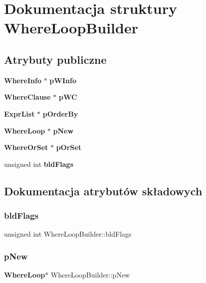 \section{Dokumentacja struktury Where\+Loop\+Builder}
\label{struct_where_loop_builder}
\subsection*{Atrybuty publiczne}
\begin{DoxyCompactItemize}
\item 
\textbf{ Where\+Info} $\ast$ \textbf{ p\+W\+Info}
\item 
\textbf{ Where\+Clause} $\ast$ \textbf{ p\+WC}
\item 
\textbf{ Expr\+List} $\ast$ \textbf{ p\+Order\+By}
\item 
\textbf{ Where\+Loop} $\ast$ \textbf{ p\+New}
\item 
\textbf{ Where\+Or\+Set} $\ast$ \textbf{ p\+Or\+Set}
\item 
unsigned int \textbf{ bld\+Flags}
\end{DoxyCompactItemize}


\subsection{Dokumentacja atrybutów składowych}
\mbox{\label{struct_where_loop_builder_af22ad9c5a89e144a9ff290b8248b14b4}} 
\subsubsection{bldFlags}
{\footnotesize\ttfamily unsigned int Where\+Loop\+Builder\+::bld\+Flags}

\mbox{\label{struct_where_loop_builder_ae3ab5ddb99b1d4697f573e9b25442f65}} 
\subsubsection{pNew}
{\footnotesize\ttfamily \textbf{ Where\+Loop}$\ast$ Where\+Loop\+Builder\+::p\+New}

\mbox{\label{struct_where_loop_builder_a16de740f297add3d4b36905c21554a86}} 
